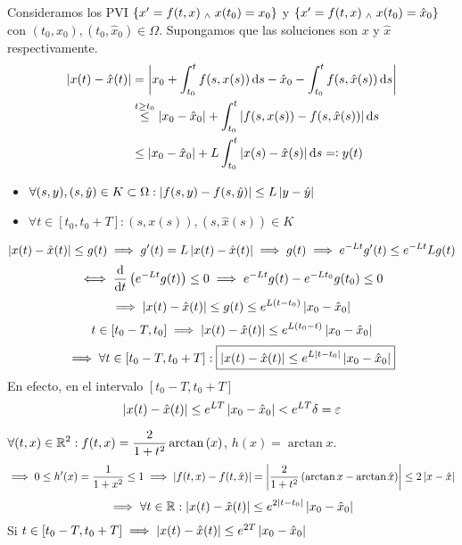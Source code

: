 Consideramos los PVI $\{x'=f(t, x) \; _{\wedge} \; x(t_0) = x_0\}$ y $\{x'=f(t, x) \; _{\wedge} \; x(t_0) = \hat{x}_0\}$ con $(t_0, x_0), (t_0, \hat{x}_0) \in \Omega$. Supongamos que las soluciones son $x$ y $\hat{x}$ respectivamente.
\[\begin{aligned}
	\abs{x(t) - \hat{x}(t)} &= \abs{x_0 + \int_{t_0}^{t} f(s, x(s)) \odif{s} - \hat{x}_0 - \int_{t_0}^{t} f(s, \hat{x}(s)) \odif{s}} \\
	&\stackrel{t\geq t_0}{\leq} \abs{x_0 - \hat{x}_0} + \int_{t_0}^{t} \abs{f(s, x(s)) - f(s, \hat{x}(s))} \odif{s} \\
	&\leq \abs{x_0 - \hat{x}_0} + L\int_{t_0}^{t} \abs{x(s) - \hat{x}(s)} \odif{s} \eqdef y(t)
\end{aligned}\]
\begin{itemize}
	\item $\forall (s, y), (s, \hat{y}) \in K\subset \Omega : \left|f(s, y) - f(s, \hat{y})\right| \leq L \left|y-\hat{y}\right|$
	\item $\forall t \in [t_0, t_0 + T] : (s, x(s)), (s, \hat{x}(s)) \in K$
\end{itemize}
\[\left|x(t) - \hat{x}(t)\right| \leq g(t) \implies g'(t) = L\left|x(t) - \hat{x}(t)\right| \implies g(t) \implies e^{-Lt}g'(t) \leq e^{-Lt}Lg(t) \]
\[\iff \odv{}{t} \left(e^{-Lt} g(t)\right) \leq 0 \implies e^{-Lt}g(t) - e^{-Lt_0}g(t_0) \leq 0\]
\[\implies \left|x(t) - \hat{x}(t)\right| \leq g(t) \leq e^{L(t-t_0)} \left|x_0-\hat{x}_0\right|\]
\[t\in [t_0 - T, t_0] \implies \left|x(t) - \hat{x}(t)\right| \leq e^{L(t_0-t)} \left|x_0-\hat{x}_0\right|\]
\[\implies \forall t \in [t_0 - T, t_0+T] : \boxed{\left|x(t) - \hat{x}(t)\right| \leq e^{L\left|t-t_0\right|} \left|x_0-\hat{x}_0\right|}\]
En efecto, en el intervalo $[t_0-T, t_0+T]$
\[\left|x(t) - \hat{x}(t)\right| \leq e^{LT}\left|x_0-\hat{x}_0\right| < e^{LT}\delta = \varepsilon\]

\begin{ejem}
	$\displaystyle \forall (t, x) \in \mathbb{R}^2 : f(t, x) = \frac{2}{1+t^2} \arctan{(x)}$, $h(x) = \arctan{x}$.
	\[\implies 0 \leq h'(x) = \frac{1}{1+x^2} \leq 1 \implies \left|f(t, x) - f(t, \hat{x})\right| = \left|\frac{2}{1+t^2} \left(\arctan{x} - \arctan{\hat{x}}\right)\right| \leq 2\left|x-\hat{x}\right|\]
	\[\implies \forall t \in \mathbb{R} : \left|x(t) - \hat{x}(t)\right| \leq e^{2\left|t-t_0\right|}\left|x_0 - \hat{x}_0\right|\]
	Si $t\in [t_0 - T, t_0 + T] \implies \left|x(t) - \hat{x}(t)\right| \leq e^{2T}\left|x_0 - \hat{x}_0\right|$
\end{ejem}